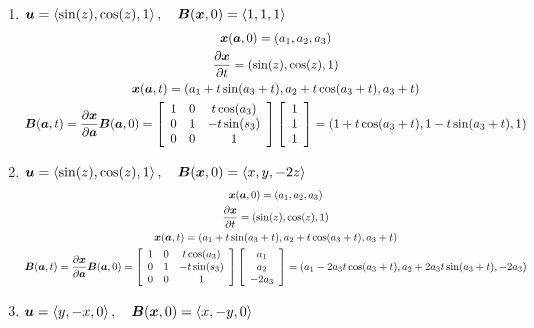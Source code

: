 \documentclass{article}
\begin{document}
\begin{enumerate}
    \item $\boldsymbol{u} = \left< \sin(z), \cos(z), 1\right>, \quad \boldsymbol{B}(\boldsymbol{x},0) = \left< 1,
    1, 1\right>$
    \begin{gather*}
        \boldsymbol{x}(\boldsymbol{a}, 0) = \left(a_1, a_2, a_3\right)\\
        \frac{\partial \boldsymbol{x}}{\partial t} = \left(\sin(z), \cos(z), 1\right)\\
        \boldsymbol{x}(\boldsymbol{a},t) = \left(a_1 + t\sin(a_3 + t), a_2 + t\cos(a_3 + t), a_3 + t\right)\\
        \boldsymbol{B}(\boldsymbol{a},t) = \frac{\partial \boldsymbol{x}}{\partial \boldsymbol{a}}\boldsymbol{B}(\boldsymbol{a},0)
        = \left[\begin{array}{c c c}
        1 & 0 & t\cos(a_3)\\
        0 & 1 & -t\sin(s_3)\\
        0 & 0 & 1\end{array}\right] \left[\begin{array}{c}
        1\\1\\1\end{array}\right] = \left(1 + t\cos(a_3+t), 1 -
        t\sin(a_3+t), 1\right)
    \end{gather*}
    \item $\boldsymbol{u} = \left< \sin(z), \cos(z), 1\right>, \quad \boldsymbol{B}(\boldsymbol{x},0) = \left< x,
    y, -2z\right>$
    \begin{gather*}
        \boldsymbol{x}(\boldsymbol{a}, 0) = \left(a_1, a_2, a_3\right)\\
        \frac{\partial \boldsymbol{x}}{\partial t} = \left(\sin(z), \cos(z), 1\right)\\
        \boldsymbol{x}(\boldsymbol{a},t) = \left(a_1 + t\sin(a_3 + t), a_2 + t\cos(a_3 + t), a_3 + t\right)\\
        \boldsymbol{B}(\boldsymbol{a},t) = \frac{\partial \boldsymbol{x}}{\partial \boldsymbol{a}}\boldsymbol{B}(\boldsymbol{a},0)
        = \left[\begin{array}{c c c}
        1 & 0 & t\cos(a_3)\\
        0 & 1 & -t\sin(s_3)\\
        0 & 0 & 1\end{array}\right] \left[\begin{array}{c}
        a_1\\a_2\\-2a_3\end{array}\right] = \left(a_1 - 2a_3t\cos(a_3+t), a_2 +
        2a_3t\sin(a_3+t), -2a_3\right)
    \end{gather*}
    \item $\boldsymbol{u} = \left< y, -x, 0\right>, \quad \boldsymbol{B}(\boldsymbol{x},0) = \left< x,
    -y, 0\right>$
    \begin{gather*}

\end{gather*}
\end{enumerate}
\end{document}
